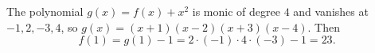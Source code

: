 The polynomial $g(x)=f(x)+x^2$ is monic of degree $4$ and vanishes at $-1,2,-3,4$, so $g(x)=(x+1)(x-2)(x+3)(x-4)$. Then
\[f(1)=g(1)-1=2\cdot(-1)\cdot4\cdot(-3)-1=\boxed{23}.\]
